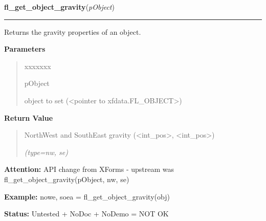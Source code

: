     \label{xformslib:library:fl_get_object_gravity}

    \vspace{0.5ex}

\hspace{.8\funcindent}\begin{boxedminipage}{\funcwidth}

    \raggedright \textbf{fl\_get\_object\_gravity}(\textit{pObject})

    \vspace{-1.5ex}

    \rule{\textwidth}{0.5\fboxrule}
\setlength{\parskip}{2ex}
    Returns the gravity properties of an object.

\setlength{\parskip}{1ex}
      \textbf{Parameters}
      \vspace{-1ex}

      \begin{quote}
        \begin{Ventry}{xxxxxxx}

          \item[pObject]

          object to set ({\textless}pointer to 
          xfdata.FL\_OBJECT{\textgreater})

        \end{Ventry}

      \end{quote}

      \textbf{Return Value}
    \vspace{-1ex}

      \begin{quote}
      NorthWest and SouthEast gravity ({\textless}int\_pos{\textgreater}, 
      {\textless}int\_pos{\textgreater})

      {\it (type=nw, se)}

      \end{quote}

\textbf{Attention:} API change from XForms - upstream was fl\_get\_object\_gravity(pObject, nw,
se)



\textbf{Example:} nowe, soea = fl\_get\_object\_gravity(obj)



\textbf{Status:} Untested + NoDoc + NoDemo = NOT OK



    \end{boxedminipage}

